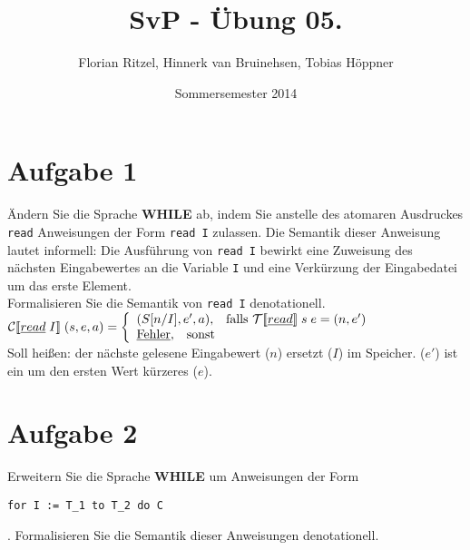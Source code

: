 \documentclass[ngerman,a4paper]{report}
\author{Florian Ritzel, Hinnerk van Bruinehsen, Tobias Höppner}
\title{SvP - Übung 05. }
\date{Sommersemester 2014}
\renewcommand{\maketitle}{}
\begin{document}
\maketitle
\section*{Aufgabe 1}
Ändern Sie die Sprache \textbf{WHILE} ab, indem Sie anstelle des atomaren Ausdruckes \lstinline!read! Anweisungen der Form \lstinline!read I! zulassen. Die Semantik dieser Anweisung lautet informell: Die Ausführung von \lstinline!read I! bewirkt eine Zuweisung des nächsten Eingabewertes an die Variable \lstinline!I! und eine Verkürzung der Eingabedatei um das erste Element.\\
Formalisieren Sie die Semantik von \lstinline!read I! denotationell.\\

%
$		\mathcal{C}
[\![\underline{read}\;I]\!]\;(s,e,a) = \left\lbrace\begin{array}{l l} (S[n/I], e', a)\text{,}\quad\text{falls }\mathcal{T}
[\![\underline{read}]\!]\;s\;e = (n, e')\\
		\underline{\text{Fehler}}\text{,}\quad\text{sonst} \end{array}\right.$\\
Soll heißen: der nächste gelesene Eingabewert ($n$) ersetzt ($I$) im Speicher. ($e'$) ist ein um den ersten Wert kürzeres ($e$).\\
\section*{Aufgabe 2}
Erweitern Sie die Sprache \textbf{WHILE} um Anweisungen der Form
\begin{lstlisting}
for I := T_1 to T_2 do C
\end{lstlisting}.
Formalisieren Sie die Semantik dieser Anweisungen denotationell.\\
%
%
%
%
\end{document}
